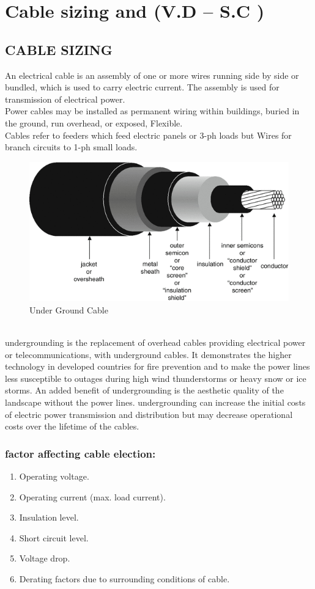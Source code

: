 \documentclass[12pt,fleqn]{book} %
\begin{document}
\chapter{Cable sizing and (V.D – S.C )}

\section {CABLE SIZING }
 An electrical cable is an assembly of one or more wires running side by side or bundled, which is used to carry electric current. The assembly is used for transmission of electrical power. 
 \\ Power cables may be installed as permanent wiring within buildings, buried in the ground, run overhead, or exposed, Flexible.
 \\Cables refer to feeders which feed electric panels or 3-ph loads but Wires for branch circuits to 1-ph small loads.
 \begin{figure}[h!]
    \centering
    \includegraphics[width=0.5\linewidth]{yousef 1.png}
    \caption{Under Ground Cable}
    \label{fig:yousef 1}
\end{figure} 
\\undergrounding is the replacement of overhead cables providing electrical power or
telecommunications, with underground cables. It demonstrates the higher technology in developed countries for fire prevention and to make the power lines less susceptible to outages during high wind thunderstorms or heavy snow or ice storms. An added benefit of undergrounding is the aesthetic quality of the landscape without the power lines. undergrounding can increase the initial costs of electric power transmission and distribution but may decrease operational costs over the lifetime of the cables.
\subsection{ factor affecting cable election:}
\begin{enumerate}
    \item Operating voltage.
    \item Operating current (max. load current).
    \item Insulation level.
    \item Short circuit level.
    \item Voltage drop.
    \item  Derating factors due to surrounding conditions of cable.
    \end{enumerate}
\end{document}
